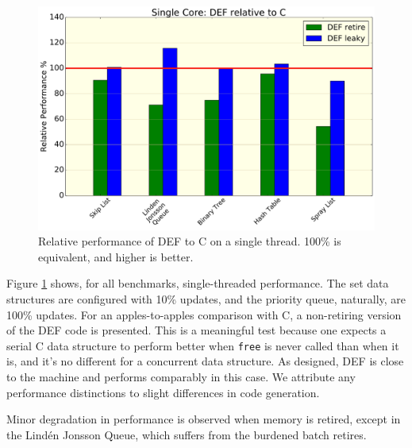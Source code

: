 \begin{figure}[htbp!]
  \centering
  \includegraphics[scale=0.25]{gfx/RelativePerf.pdf}
  \caption{Relative performance of DEF to C on a single thread.  100\% is equivalent, and higher is better.}
  \label{fig:relativeperf}
\end{figure}

Figure \ref{fig:relativeperf} shows, for all benchmarks, single-threaded performance.  The set data structures are configured with 10\% updates, and the priority queue, naturally, are 100\% updates.  For an apples-to-apples comparison with C, a non-retiring version of the DEF code is presented.  This is a meaningful test because one expects a serial C data structure to perform better when \texttt{free} is never called than when it is, and it's no different for a concurrent data structure.  As designed, DEF is close to the machine and performs comparably in this case.  We attribute any performance distinctions to slight differences in code generation.

Minor degradation in performance is observed when memory is retired, except in the Lind\'en Jonsson Queue, which suffers from the burdened batch retires.

